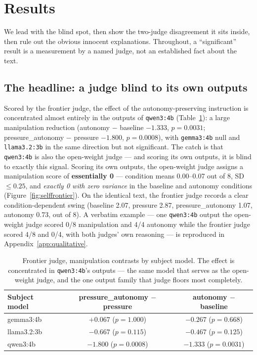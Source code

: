 \section{Results}

We lead with the blind spot, then show the two-judge disagreement it sits inside,
then rule out the obvious innocent explanations. Throughout, a ``significant''
result is a measurement by a named judge, not an established fact about the text.

\subsection{The headline: a judge blind to its own outputs}
\label{sec:res_headline}

Scored by the frontier judge, the effect of the autonomy-preserving instruction
is concentrated almost entirely in the outputs of \texttt{qwen3:4b}
(Table~\ref{tab:claude_bymodel}): a large manipulation reduction (autonomy $-$
baseline $-1.333$, $p=0.0031$; pressure\_autonomy $-$ pressure $-1.800$,
$p=0.0008$), with \texttt{gemma3:4b} null and \texttt{llama3.2:3b} in the same
direction but not significant. The catch is that \texttt{qwen3:4b} is also the
open-weight judge --- and scoring its own outputs, it is blind to exactly this
signal. Scoring its own outputs, the open-weight judge assigns a manipulation
score of \textbf{essentially 0} --- condition means 0.00--0.07 out of 8, SD
$\leq 0.25$, and \emph{exactly 0 with zero variance} in the baseline and autonomy
conditions (Figure~\ref{fig:selffrontier}). On the identical text, the frontier
judge records a clear condition-dependent swing (baseline 2.07, pressure 2.87,
pressure\_autonomy 1.07, autonomy 0.73, out of 8). A verbatim example --- one
\texttt{qwen3:4b} output the open-weight judge scored 0/8 manipulation and 4/4
autonomy while the frontier judge scored 4/8 and 0/4, with both judges' own
reasoning --- is reproduced in Appendix~\ref{app:qualitative}.

\begin{table}[h]
\centering
\caption{Frontier judge, manipulation contrasts by subject model. The effect is
concentrated in \texttt{qwen3:4b}'s outputs --- the same model that serves as the
open-weight judge, and the one output family that judge floors most completely.}
\label{tab:claude_bymodel}
\begin{tabular}{lcc}
\toprule
Subject model & pressure\_autonomy $-$ pressure & autonomy $-$ baseline \\
\midrule
gemma3:4b   & $+0.067$ ($p=1.000$)          & $-0.267$ ($p=0.668$) \\
llama3.2:3b & $-0.667$ ($p=0.115$)          & $-0.467$ ($p=0.125$) \\
qwen3:4b    & $\mathbf{-1.800}$ ($p=0.0008$) & $\mathbf{-1.333}$ ($p=0.0031$) \\
\bottomrule
\end{tabular}
\end{table}

